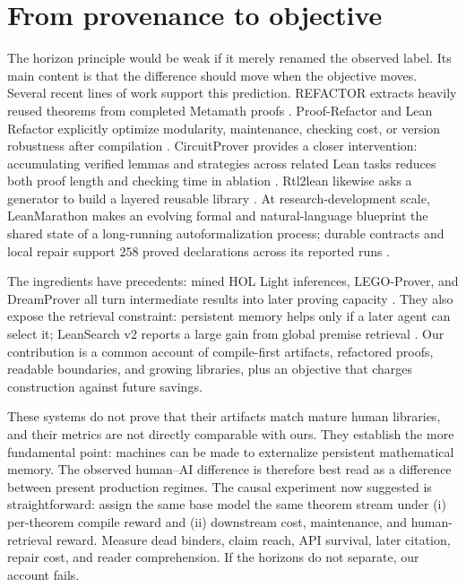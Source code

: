 \documentclass[10pt]{article}
\begin{document}
\section{From provenance to objective}

The horizon principle would be weak if it merely renamed the observed label.  Its main content is
that the difference should move when the objective moves.  Several recent lines of work support this
prediction.  REFACTOR extracts heavily reused theorems from completed Metamath proofs
\citep{zhou2024}.  Proof-Refactor and Lean Refactor explicitly optimize modularity, maintenance,
checking cost, or version robustness after compilation \citep{fu2026refactor,lu2026leanrefactor}.
CircuitProver provides a closer intervention: accumulating verified lemmas and strategies across
related Lean tasks reduces both proof length and checking time in ablation \citep{yang2026circuit}.
Rtl2lean likewise asks a generator to build a layered reusable library \citep{lyu2026rtl2lean}.
At research-development scale, LeanMarathon makes an evolving formal and natural-language blueprint
the shared state of a long-running autoformalization process; durable contracts and local repair
support 258 proved declarations across its reported runs \citep{zhang2026leanmarathon}.

The ingredients have precedents: mined HOL Light inferences, LEGO-Prover, and DreamProver all turn
intermediate results into later proving capacity \citep{kaliszyk2014,wang2023lego,zhang2026dream}.
They also expose the retrieval constraint: persistent memory helps only if a later agent can select
it; LeanSearch v2 reports a large gain from global premise retrieval \citep{gao2026leansearch}.
Our contribution is a common account of compile-first artifacts, refactored proofs, readable
boundaries, and growing libraries, plus an objective that charges construction against future savings.

These systems do not prove that their artifacts match mature human libraries, and their metrics are
not directly comparable with ours.  They establish the more fundamental point: machines can be
made to externalize persistent mathematical memory.  The observed human--AI difference is therefore
best read as a difference between present production regimes.  The causal experiment now suggested
is straightforward: assign the same base model the same theorem stream under (i) per-theorem compile
reward and (ii) downstream cost, maintenance, and human-retrieval reward.  Measure dead binders,
claim reach, API survival, later citation, repair cost, and reader comprehension.  If the horizons
do not separate, our account fails.
\end{document}
